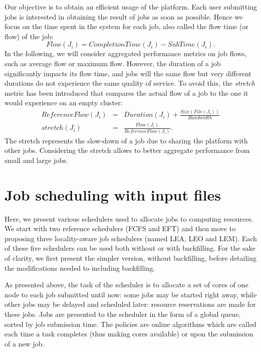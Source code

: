 \documentclass[conference,10pt]{IEEEtran}
\newcommand{\file}{\ensuremath{\mathit{File}}\xspace}
\newcommand{\size}{\ensuremath{\mathit{Size}}\xspace}
\newcommand{\duration}{\mathit{Duration}\xspace}
\newcommand{\bandwidth}{\mathit{Bandwidth}\xspace}
\newcommand{\submissiontime}{\mathit{SubTime}\xspace}
\newcommand{\emptyflow}{\mathit{ReferenceFlow}\xspace}
\newcommand{\completiontime}{\mathit{CompletionTime}\xspace}
\newcommand{\start}{\mathit{StartTime}\xspace}
\begin{document}
Our objective is to obtain an efficient usage of the platform. Each
user submitting jobs is interested in obtaining the result of jobs
as soon as possible. Hence we focus on the time spent in the system
for each job, also called the flow time (or flow) of the job:
$$
\mathit{Flow}(J_i) = \completiontime(J_i) - \submissiontime(J_i).
$$
In the following, we will consider aggregated performance metrics on
job flows, such as average flow or maximum flow. However, the duration
of a job significantly impacts its flow time, and jobs will the same
flow but very different durations do not experience the same quality
of service. To avoid this, the \emph{stretch} metric has been
introduced that compares the actual flow of a job to the one it would
experience on an empty cluster:
\begin{eqnarray*}
\emptyflow(J_i) &=& \duration(J_i) + \frac{\size(\file(J_i))}{\bandwidth}\\
\mathit{stretch}(J_i) &=& \frac{\mathit{Flow}(J_i)}{\emptyflow(J_i)}.
\end{eqnarray*}
The stretch represents the slow-down of a job due to sharing the
platform with other jobs. Considering the stretch
allows to better aggregate performance from small and large jobs.



\section{Job scheduling with input files}\label{sec.schedulers}


Here, we present various schedulers used to allocate jobs to
computing resources. We start with two reference schedulers (FCFS and EFT)
and then move to proposing three locality-aware job schedulers (named
LEA, LEO and LEM). Each of these five schedulers can be used both
without or with backfilling. For the sake of clarity, we first present
the simpler version, without backfilling, before detailing the modifications needed to including backfilling.

As presented above, the task of the scheduler is to allocate a set of
cores of one node
to each job submitted until now: some jobs may be started right away,
while other jobs may be delayed and scheduled later: resource
reservations are made for these jobs. Jobs are presented to the
scheduler in the form of a global queue, sorted by job submission
time. The policies are online algorithms which are called each time
a task completes (thus making cores available) or upon the submission of
a new job.
\end{document}
